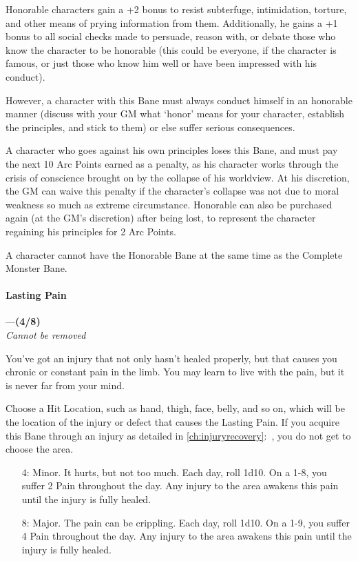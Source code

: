 \documentclass[oneside,11pt,english]{book}
\begin{document}
Honorable characters gain a +2 bonus to resist subterfuge, intimidation, torture, and other means of 
prying information from them. Additionally, he gains a +1 bonus to all social checks made to persuade, 
reason with, or debate those who know the character to be honorable (this could be everyone, if the 
character is famous, or just those who know him well or have been impressed with his conduct). 

However, a character with this Bane must always conduct himself in an honorable manner (discuss with 
your GM what ‘honor’ means for your character, establish the principles, and stick to them) or else suffer serious consequences. 

A character who goes against his own principles loses this Bane, and must pay the next 10 Arc Points 
earned as a penalty, as his character works through the crisis of conscience brought on by the collapse of 
his worldview. At his discretion, the GM can waive this penalty if the character's collapse was not due to 
moral weakness so much as extreme circumstance. Honorable can also be purchased again (at the GM's 
discretion) after being lost, to represent the character regaining his principles for 2 Arc Points. 
 
A character cannot have the Honorable Bane at the same time as the Complete Monster Bane. 
\paragraph{\label{bane:Lasting Pain}Lasting Pain}---\quad\textbf{(4/8) }\\
\emph{Cannot be removed}\par
You've got an injury that not only hasn't healed properly, but that causes you chronic or constant pain in the limb. You may learn to live with the pain, but it is never far from your mind.


Choose a Hit Location, such as hand, thigh, face, belly, and so on, which will be the location of the injury or defect that causes the Lasting Pain. If you acquire this Bane through an injury as detailed in \autoref{ch:injuryrecovery}:~, you do not get to choose the area. 
\begin{itemize}
	\item [4:] Minor. It hurts, but not too much. Each day, roll 1d10. On a 1-8, you suffer 2 Pain throughout the day. Any injury to the area awakens this pain until the injury is fully healed. 
	\item [8:] Major. The pain can be crippling. Each day, roll 1d10. On a 1-9, you suffer 4 Pain throughout the day. Any injury to the area awakens this pain until the injury is fully healed.
\end{itemize}
\end{document}
